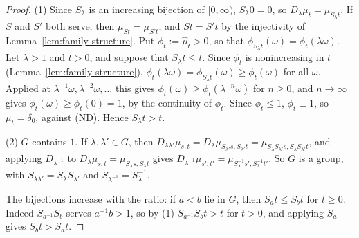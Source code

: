 \begin{proof}
\leanok
{}
(1) Since $S_\lambda$ is an increasing bijection of $[0,\infty)$, $S_\lambda0 = 0$, so
$D_\lambda\mu_t = \mu_{S_\lambda t}$. If $S$ and $S'$ both serve, then $\mu_{St} = \mu_{S't}$, and
$St = S't$ by the injectivity of Lemma~\ref{lem:family-structure}. Put
$\phi_t := \widehat\mu_t > 0$, so that $\phi_{S_\lambda t}(\omega) = \phi_t(\lambda\omega)$. Let
$\lambda > 1$ and $t > 0$, and suppose that $S_\lambda t \le t$. Since $\phi_t$ is nonincreasing in
$t$ (Lemma~\ref{lem:family-structure}), $\phi_t(\lambda\omega) = \phi_{S_\lambda t}(\omega) \ge
\phi_t(\omega)$ for all $\omega$. Applied at $\lambda^{-1}\omega, \lambda^{-2}\omega, \dots$ this
gives $\phi_t(\omega) \ge \phi_t(\lambda^{-n}\omega)$ for $n \ge 0$, and $n \to \infty$ gives
$\phi_t(\omega) \ge \phi_t(0) = 1$, by the continuity of $\phi_t$. Since $\phi_t \le 1$, $\phi_t \equiv 1$,
so $\mu_t = \delta_0$, against (ND). Hence $S_\lambda t > t$.

(2) $G$ contains $1$. If $\lambda, \lambda' \in G$, then
$D_{\lambda\lambda'}\mu_{s,t} = D_\lambda\mu_{S_{\lambda'}s, S_{\lambda'}t} =
\mu_{S_\lambda S_{\lambda'}s, S_\lambda S_{\lambda'}t}$, and applying $D_{\lambda^{-1}}$ to
$D_\lambda\mu_{s,t} = \mu_{S_\lambda s, S_\lambda t}$ gives
$D_{\lambda^{-1}}\mu_{s',t'} = \mu_{S_\lambda^{-1}s', S_\lambda^{-1}t'}$. So $G$ is a group, with
$S_{\lambda\lambda'} = S_\lambda S_{\lambda'}$ and $S_{\lambda^{-1}} = S_\lambda^{-1}$.

The bijections increase with the ratio: if $a < b$ lie in $G$, then $S_at \le S_bt$ for $t \ge 0$.
Indeed $S_{a^{-1}}S_b$ serves $a^{-1}b > 1$, so by (1) $S_{a^{-1}}S_bt > t$ for $t > 0$, and
applying $S_a$ gives $S_bt > S_at$.


\end{proof}
